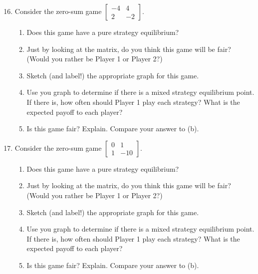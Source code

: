 \begin{enumerate}
\setcounter{enumi}{15}
\item Consider the zero-sum game $\left[\begin{matrix}
-4&4\\
2&-2

\end{matrix}\right].
$
\begin{enumerate}
\item Does this game have a pure strategy equilibrium?
\item Just by looking at the matrix, do you think this game will be fair? (Would you rather be Player 1 or Player 2?)
\item Sketch (and label!) the appropriate graph for this game.
\item Use you graph to determine if there is a mixed strategy equilibrium point. If there is, how often should Player 1 play each strategy? What is the expected payoff to each player? 
\item Is this game fair? Explain. Compare your answer to (b).
\end{enumerate}

\item  Consider the zero-sum game $\left[\begin{matrix}
0&1\\
1&-10

\end{matrix}\right].
$
\begin{enumerate}
\item Does this game have a pure strategy equilibrium?
\item Just by looking at the matrix, do you think this game will be fair? (Would you rather be Player 1 or Player 2?)

\item Sketch (and label!) the appropriate graph for this game.
\item Use you graph to determine if there is a mixed strategy equilibrium point. If there is, how often should Player 1 play each strategy? What is the expected payoff to each player? 
\item Is this game fair? Explain. Compare your answer to (b).
\end{enumerate}

\end{enumerate}



 